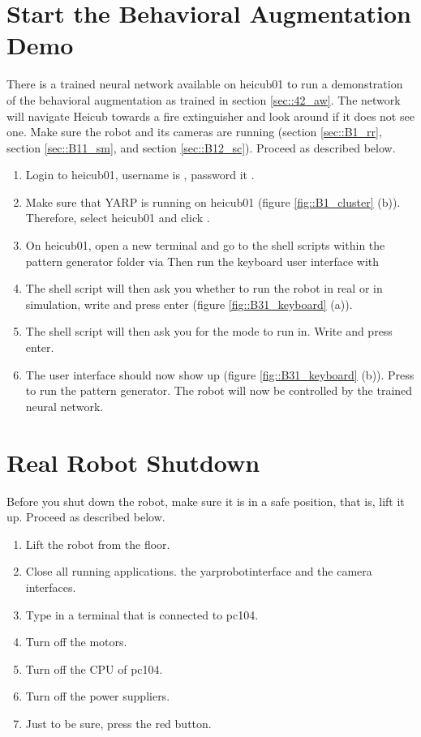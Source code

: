 \section{Start the Behavioral Augmentation Demo}
\label{sec::B4_ba}
There is a trained neural network available on heicub01 to run a demonstration of the behavioral augmentation as trained in section \ref{sec::42_aw}. The network will navigate Heicub towards a fire extinguisher and look around if it does not see one. Make sure the robot and its cameras are running (section \ref{sec::B1_rr}, section \ref{sec::B11_sm}, and section \ref{sec::B12_sc}). Proceed as described below.
\begin{enumerate}
	\item Login to heicub01, username is , password it .
	\item Make sure that YARP is running on heicub01 (figure \ref{fig::B1_cluster} (b)). Therefore, select heicub01 and click .
	\item On heicub01, open a new terminal and go to the shell scripts within the pattern generator folder via \newline {}
	\newline Then run the keyboard user interface with
	\newline {}
	\item The shell script will then ask you whether to run the robot in real or in simulation, write  and press enter (figure \ref{fig::B31_keyboard} (a)).
	\item The shell script will then ask you for the mode to run in. Write  and press enter.
	\item The user interface should now show up (figure \ref{fig::B31_keyboard} (b)). Press  to run the pattern generator. The robot will now be controlled by the trained neural network.
\end{enumerate}
\FloatBarrier
\section{Real Robot Shutdown}
Before you shut down the robot, make sure it is in a safe position, that is, lift it up. Proceed as described below.
\begin{enumerate}
	\item Lift the robot from the floor.
	\item Close all running applications.  the yarprobotinterface and the camera interfaces.
	\item Type  in a terminal that is connected to pc104.
	\item Turn off the motors.
	\item Turn off the CPU of pc104.
	\item Turn off the power suppliers.
	\item Just to be sure, press the red button.
\end{enumerate}